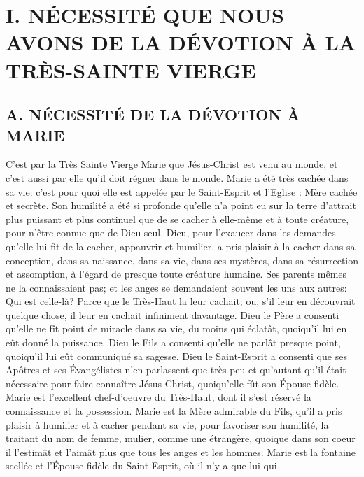 \hspace{0pt}
\newpage
\section{I. NÉCESSITÉ QUE NOUS AVONS DE LA DÉVOTION À LA TRÈS-SAINTE VIERGE}
\subsection{A. NÉCESSITÉ DE LA DÉVOTION À MARIE}
 C'est par la Très Sainte Vierge Marie que Jésus-Christ est venu au monde, et c'est aussi par elle qu'il doit
régner dans le monde.
 Marie a été très cachée dans sa vie: c'est pour quoi elle est appelée par le Saint-Esprit et l'Eglise :
Mère cachée et secrète. Son humilité a été si profonde qu'elle n'a point eu sur la terre d'attrait plus puissant et plus
continuel que de se cacher à elle-même et à toute créature, pour n'être connue que de Dieu seul.
 Dieu, pour l'exaucer dans les demandes qu'elle lui fit de la cacher, appauvrir et humilier, a pris plaisir à la
cacher dans sa conception, dans sa naissance, dans sa vie, dans ses mystères, dans sa résurrection et
assomption, à l'égard de presque toute créature humaine. Ses parents mêmes ne la connaissaient pas; et les
anges se demandaient souvent les uns aux autres:  Qui est celle-là? Parce que le Très-Haut la leur
cachait; ou, s'il leur en découvrait quelque chose, il leur en cachait infiniment davantage.
 Dieu le Père a consenti qu'elle ne fît point de miracle dans sa vie, du moins qui éclatât, quoiqu'il lui en eût
donné la puissance. Dieu le Fils a consenti qu'elle ne parlât presque point, quoiqu'il lui eût communiqué sa
sagesse. Dieu le Saint-Esprit a consenti que ses Apôtres et ses Évangélistes n'en parlassent que très peu et
qu'autant qu'il était nécessaire pour faire connaître Jésus-Christ, quoiqu'elle fût son Épouse fidèle.
 Marie est l'excellent chef-d'oeuvre du Très-Haut, dont il s'est réservé la connaissance et la possession. Marie
est la Mère admirable du Fils, qu'il a pris plaisir à humilier et à cacher pendant sa vie, pour favoriser son humilité,
la traitant du nom de femme, mulier, comme une étrangère, quoique dans son coeur il l'estimât et l'aimât plus que
tous les anges et les hommes. Marie est la fontaine scellée et l'Épouse fidèle du Saint-Esprit, où il n'y a que lui qui
